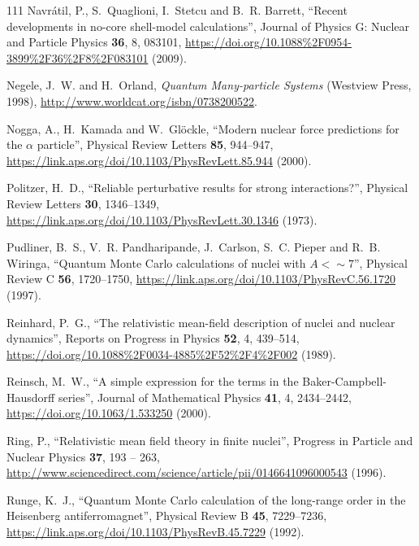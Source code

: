 \documentclass[12pt,letterpaper,UTF8]{report}
\begin{document}
{\begin{thebibliography}{111}
Navr{\'{a}}til, P., S.~Quaglioni, I.~Stetcu and B.~R. Barrett, \enquote{Recent
  developments in no-core shell-model calculations}, Journal of Physics G:
  Nuclear and Particle Physics \textbf{36}, 8, 083101,
  \urlprefix\url{https://doi.org/10.1088%2F0954-3899%2F36%2F8%2F083101} (2009).

Negele, J.~W. and H.~Orland, \emph{Quantum Many-particle Systems} (Westview
  Press, 1998), \urlprefix\url{http://www.worldcat.org/isbn/0738200522}.

Nogga, A., H.~Kamada and W.~Gl\"ockle, \enquote{Modern nuclear force
  predictions for the $\mathit{\ensuremath{\alpha}}$ particle}, Physical Review
  Letters \textbf{85}, 944--947,
  \urlprefix\url{https://link.aps.org/doi/10.1103/PhysRevLett.85.944} (2000).

Politzer, H.~D., \enquote{Reliable perturbative results for strong
  interactions?}, Physical Review Letters \textbf{30}, 1346--1349,
  \urlprefix\url{https://link.aps.org/doi/10.1103/PhysRevLett.30.1346} (1973).

Pudliner, B.~S., V.~R. Pandharipande, J.~Carlson, S.~C. Pieper and R.~B.
  Wiringa, \enquote{Quantum {Monte} {Carlo} calculations of nuclei with {$A <
  \sim 7$}}, Physical Review C \textbf{56}, 1720--1750,
  \urlprefix\url{https://link.aps.org/doi/10.1103/PhysRevC.56.1720} (1997).

Reinhard, P.~G., \enquote{The relativistic mean-field description of nuclei and
  nuclear dynamics}, Reports on Progress in Physics \textbf{52}, 4, 439--514,
  \urlprefix\url{https://doi.org/10.1088%2F0034-4885%2F52%2F4%2F002} (1989).

Reinsch, M.~W., \enquote{A simple expression for the terms in the
  {B}aker-{C}ampbell-{H}ausdorff series}, Journal of Mathematical Physics
  \textbf{41}, 4, 2434--2442, \urlprefix\url{https://doi.org/10.1063/1.533250}
  (2000).

Ring, P., \enquote{Relativistic mean field theory in finite nuclei}, Progress
  in Particle and Nuclear Physics \textbf{37}, 193 -- 263,
  \urlprefix\url{http://www.sciencedirect.com/science/article/pii/0146641096000543}
  (1996).

Runge, K.~J., \enquote{Quantum {Monte} {Carlo} calculation of the long-range
  order in the {Heisenberg} antiferromagnet}, Physical Review B \textbf{45},
  7229--7236, \urlprefix\url{https://link.aps.org/doi/10.1103/PhysRevB.45.7229}
  (1992).


\end{thebibliography}}
\end{document}
